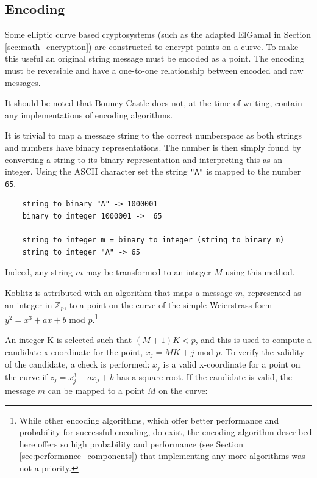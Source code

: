 \subsection{Encoding}
\label{sec:math_encoding}

Some elliptic curve based cryptosystems (such as the adapted ElGamal in Section \ref{sec:math_encryption}) are constructed to encrypt points on a curve. To make
this useful an original string message must be encoded as a point. The encoding must be reversible and have a one-to-one relationship between encoded and raw
messages.

It should be noted that Bouncy Castle does not, at the time of writing, contain any implementations of encoding algorithms.

It is trivial to map a message string to the correct numberspace as both strings and numbers have binary representations. The number is then
simply found by converting a string to its binary representation and interpreting this as an integer. Using the ASCII character set the string
\verb+"A"+ is mapped to the number \verb+65+.

\begin{verbatim}
    string_to_binary "A" -> 1000001
    binary_to_integer 1000001 ->  65
    
    string_to_integer m = binary_to_integer (string_to_binary m)
    string_to_integer "A" -> 65
\end{verbatim}

Indeed, any string \(m\) may be transformed to an integer \(M\) using this method.

Koblitz is attributed with an algorithm that maps a message \(m\), represented as an integer in \(\mathbb{Z}_p\), to a point on the curve of the
simple Weierstrass form \(y^2 = x^3 + ax + b \text{ mod } p\).\footnote{While other encoding algorithms, which offer better performance and probability
for successful encoding, do exist,\cite{MappingAMessage}\cite{InjectiveEncodings} the encoding algorithm described here offers so high probability
and performance (see Section \ref{sec:performance_components}) that implementing any more algorithms was not a priority.}\cite{MappingAMessage}

An integer K is selected such that \((M + 1)K < p\), and this is used to compute
a candidate x-coordinate for the point, \(x_j = MK + j \text{ mod } p\). To verify the validity of the candidate, a check is performed: \(x_j\)
is a valid x-coordinate for a point on the curve if \(z_j = x_j^3 + ax_j + b\) has a square root. If the candidate is valid, the message \(m\)
can be mapped to a point \(M\) on the curve:

